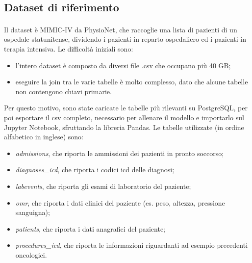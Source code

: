 \documentclass[10pt,a4paper]{article}
\begin{document}
        \subsection*{Dataset di riferimento}
        Il dataset è MIMIC-IV da PhysioNet\textsuperscript{\cite{dataset}}, che raccoglie una lista di pazienti di un ospedale statunitense, dividendo
        i pazienti in reparto ospedaliero ed i pazienti in terapia intensiva. Le difficoltà iniziali sono:
        \begin{itemize}
            \item l'intero dataset è composto da diversi file .csv che occupano più 40 GB;
            \item eseguire la join tra le varie tabelle è molto complesso, dato che alcune tabelle non contengono chiavi primarie.
        \end{itemize}
        Per questo motivo, sono state caricate le tabelle più rilevanti su PostgreSQL, per poi esportare il csv completo,
        necessario per allenare il modello e importarlo sul Jupyter Notebook, sfruttando la libreria Pandas. Le tabelle
        utilizzate (in ordine alfabetico in inglese) sono:
        \begin{itemize}
            \item \textit{admissions}, che riporta le ammissioni dei pazienti in pronto soccorso;
            \item \textit{diagnoses_icd}, che riporta i codici icd delle diagnosi;
            \item \textit{labevents}, che riporta gli esami di laboratorio del paziente;
            \item \textit{omr}, che riporta i dati clinici del paziente (es. peso, altezza, pressione sanguigna);
            \item \textit{patients}, che riporta i dati anagrafici del paziente;
            \item \textit{procedures_icd}, che riporta le informazioni riguardanti ad esempio precedenti oncologici.
        \end{itemize}
\end{document}
